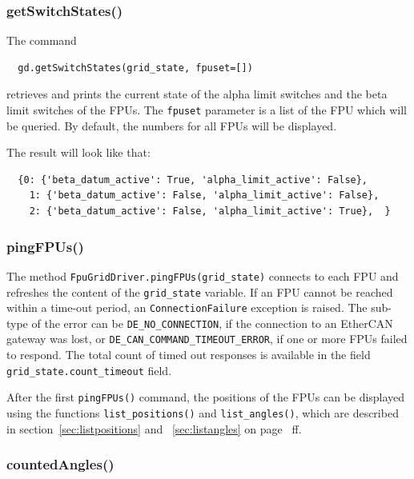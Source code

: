 \documentclass[11pt,a4paper]{scrartcl}
\begin{document}
\subsubsection{getSwitchStates()}

The command
\begin{verbatim}
  gd.getSwitchStates(grid_state, fpuset=[])
\end{verbatim}
retrieves and prints the current state of the alpha limit switches
and the beta limit switches of the FPUs.  The \texttt{fpuset}
parameter is a list of the FPU which will be queried. By default, the
numbers for all FPUs will be displayed.

The result will look like that:
\begin{verbatim}
  {0: {'beta_datum_active': True, 'alpha_limit_active': False},
    1: {'beta_datum_active': False, 'alpha_limit_active': False},
    2: {'beta_datum_active': False, 'alpha_limit_active': True},  }
\end{verbatim}




\subsubsection{pingFPUs()}
\begin{sloppypar}
  The method
\texttt{FpuGridDriver.pingFPUs(grid\_state)} connects to each FPU and
refreshes the content of the \texttt{grid\_state} variable. If an FPU
cannot be reached within a time-out period, an
\texttt{ConnectionFailure} exception is raised. The sub-type of the
error can be \texttt{DE\_NO\_CONNECTION}, if the connection to an
EtherCAN gateway was lost, or
\texttt{DE\_CAN\_COMMAND\_TIMEOUT\_ERROR}, if one or more FPUs failed
to respond. The total count of timed out responses is available in the
field \texttt{grid\_state.count\_timeout} field.
\end{sloppypar}

After the first \texttt{pingFPUs()} command, the positions of the FPUs
can be displayed using the functions \texttt{list\_positions()} and
\texttt{list\_angles()}, which are described in
section~\ref{sec:listpositions} and ~\ref{sec:listangles} on
page~\pageref{sec:listpositions} ff.


\subsubsection{countedAngles()}
\label{sec:countedangles}
\end{document}
